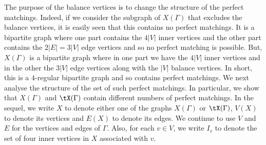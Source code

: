 \documentclass[11pt]{article}
\begin{document}
The purpose of the balance vertices is to change the structure of the perfect
matchings. Indeed, if we consider the subgraph of $X(\Gamma)$ that
excludes the balance vertices, it is easily seen that this contains no perfect
matchings. It is a bipartite graph where one part contains the $4|V|$ inner
vertices and the other part contains the $2|E| = 3|V|$ edge vertices and so no
perfect matching is possible. But, $X(\Gamma)$ is a bipartite graph where in one part
we have the $4|V|$ inner vertices and in the other the $3|V|$ edge vertices
along with the $|V|$ balance vertices. In short, this is a $4$-regular bipartite
graph and so contains perfect matchings. We next analyse the structure of the
set of such perfect matchings. In particular, we show that $X(\Gamma)$ and $\tX(\Gamma)$
contain different numbers of perfect matchings.
In the sequel, we write $X$ to denote either one of the graphs $X(\Gamma)$ or
$\tX(\Gamma)$, $V(X)$ to denote its vertices and $E(X)$ to denote its edges. We
continue to use $V$ and $E$ for the vertices and edges of $\Gamma$. Also, for each $v
\in V$, we write $I_v$ to denote the set of four inner vertices in $X$
associated with $v$.
\end{document}
